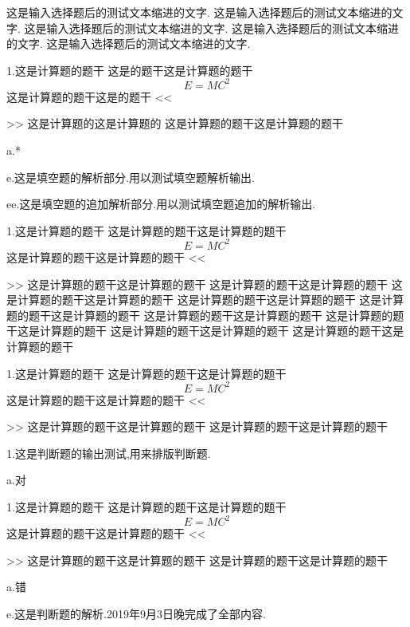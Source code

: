 \documentclass[a4paper,fontset = windowsnew]{ctexbook}
\begin{document}
这是输入选择题后的测试文本缩进的文字.
这是输入选择题后的测试文本缩进的文字.
这是输入选择题后的测试文本缩进的文字.
这是输入选择题后的测试文本缩进的文字.
这是输入选择题后的测试文本缩进的文字.
\newpage
\begin{blanks}
1.这是计算题的题干
这是的题干这是计算题的题干
\begin{equation}
  E=MC^2
\end{equation}
这是计算题的题干这是的题干
<<
>>
这是计算题的这是计算题的
这是计算题的题干这是计算题的题干

a.*

e.这是填空题的解析部分.用以测试填空题解析输出.

ee.这是填空题的追加解析部分.用以测试填空题追加的解析输出.

1.这是计算题的题干
这是计算题的题干这是计算题的题干
\begin{equation}
  E=MC^2
\end{equation}
这是计算题的题干这是计算题的题干
<<
>>
这是计算题的题干这是计算题的题干
这是计算题的题干这是计算题的题干
这是计算题的题干这是计算题的题干
这是计算题的题干这是计算题的题干
这是计算题的题干这是计算题的题干
这是计算题的题干这是计算题的题干
这是计算题的题干这是计算题的题干
这是计算题的题干这是计算题的题干
这是计算题的题干这是计算题的题干
  
1.这是计算题的题干
这是计算题的题干这是计算题的题干
\begin{equation}
  E=MC^2
\end{equation}
这是计算题的题干这是计算题的题干
<<
>>
这是计算题的题干这是计算题的题干
这是计算题的题干这是计算题的题干

\end{blanks}


\newpage

\begin{judgements}
  1.这是判断题的输出测试,用来排版判断题.

  a.对

1.这是计算题的题干
这是计算题的题干这是计算题的题干
\begin{equation}
  E=MC^2
\end{equation}
这是计算题的题干这是计算题的题干
<<
>>
这是计算题的题干这是计算题的题干
这是计算题的题干这是计算题的题干

a.错

e.这是判断题的解析.2019年9月3日晚完成了全部内容.

\end{judgements}
\end{document}
